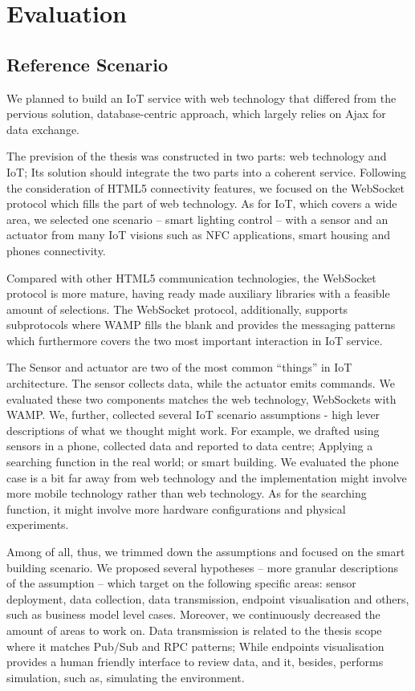\chapter{Evaluation}
\label{chapter:evaluation}

\section{Reference Scenario}
We planned to build an IoT service with web technology that differed from the pervious solution, database-centric approach, which largely relies on Ajax for data exchange. 

The prevision of the thesis was constructed in two parts: web technology and IoT; Its solution should integrate the two parts into a coherent service. Following the consideration of HTML5 connectivity features, we focused on the WebSocket protocol which fills the part of web technology. As for IoT, which covers a wide area, we selected one scenario -- smart lighting control -- with a sensor and an actuator from many IoT visions such as NFC applications, smart housing and phones connectivity. 

Compared with other HTML5 communication technologies, the WebSocket protocol is more mature, having ready made auxiliary libraries with a feasible amount of selections. The WebSocket protocol, additionally, supports subprotocols where WAMP fills the blank and provides the messaging patterns which furthermore covers the two most important interaction in IoT service.

The Sensor and actuator are two of the most common ``things'' in IoT architecture. The sensor collects data, while the actuator emits commands. We evaluated these two components matches the web technology, WebSockets with WAMP. We, further, collected several IoT scenario assumptions - high lever descriptions of what we thought might work. For example, we drafted using sensors in a phone, collected data and reported to data centre; Applying a searching function in the real world; or smart building. We evaluated the phone case is a bit far away from web technology and the implementation might involve more mobile technology rather than web technology. As for the searching function, it might involve more hardware configurations and physical experiments. 

Among of all, thus, we trimmed down the assumptions and focused on the smart building scenario. We proposed several hypotheses -- more granular descriptions of the assumption -- which target on the following specific areas: sensor deployment, data collection, data transmission, endpoint visualisation and others, such as business model level cases. Moreover, we continuously decreased the amount of areas to work on. Data transmission is related to the thesis scope where it matches Pub/Sub and RPC patterns; While endpoints visualisation provides a human friendly interface to review data, and it, besides, performs simulation, such as, simulating the environment.

